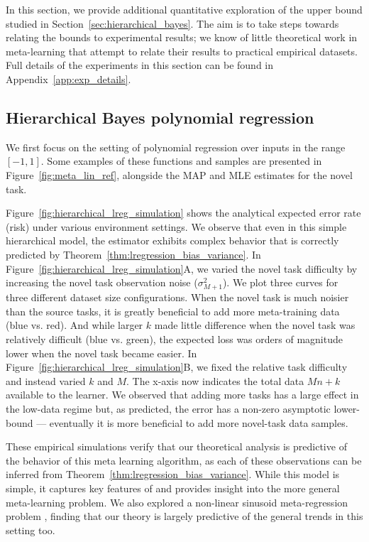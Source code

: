 In this section, we provide additional quantitative exploration of the upper bound studied in Section~\ref{sec:hierarchical_bayes}. 
The aim is to take steps towards relating the bounds to experimental results;
we know of little theoretical work in meta-learning that attempt to relate their results to
practical empirical datasets. Full details of the experiments in this section can be found in Appendix~\ref{app:exp_details}.

\subsection{Hierarchical Bayes polynomial regression}

We first focus on the setting of polynomial regression over inputs in the range $[-1,1]$. Some examples of these functions and samples are presented in Figure~\ref{fig:meta_lin_ref}, alongside the MAP and MLE estimates for the novel task. 


Figure~\ref{fig:hierarchical_lreg_simulation} shows the analytical expected error rate (risk) under various environment settings. We observe that even in this simple hierarchical model, the estimator exhibits complex behavior that is correctly predicted by Theorem~\ref{thm:lregression_bias_variance}. In Figure~\ref{fig:hierarchical_lreg_simulation}A, we varied the novel task difficulty by increasing the novel task observation noise ($\sigma^2_{M+1}$). We plot three curves for three different dataset size configurations. When the novel task is much noisier than the source tasks, it is greatly beneficial to add more meta-training data (blue vs. red). And while larger $k$ made little difference when the novel task was relatively difficult (blue vs. green), the expected loss was orders of magnitude lower when the novel task became easier. In Figure~\ref{fig:hierarchical_lreg_simulation}B, we fixed the relative task difficulty and instead varied $k$ and $M$. The x-axis now indicates the total data $Mn + k$ available to the learner. We observed that adding more tasks has a large effect in the low-data regime but, as predicted, the error has a non-zero asymptotic lower-bound --- eventually it is more beneficial to add more novel-task data samples.

These empirical simulations verify that our theoretical analysis is predictive of the behavior of this meta learning algorithm, as each of these observations can be inferred from Theorem~\ref{thm:lregression_bias_variance}. While this model is simple, it captures key features of and provides insight into the more general meta-learning problem. We also explored a non-linear sinusoid meta-regression problem \citep{finn2017model}, finding that our %
theory is largely predictive of the general trends in this setting too.

